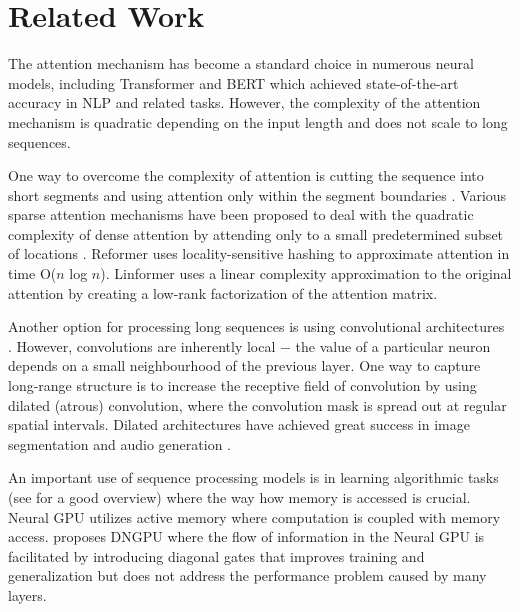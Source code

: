 \documentclass[letterpaper]{article} %
\begin{document}
\section{Related Work}

The attention mechanism \citep{bahdanau2014neural} has become a standard choice in numerous neural models, including Transformer \citep{vaswani2017attention} and BERT \citep{devlin2018bert} which achieved state-of-the-art accuracy in NLP and related tasks. However, the complexity of the attention mechanism is quadratic depending on the input length and does not scale to long sequences.

One way to overcome the complexity of attention is cutting the sequence into short segments and using attention only within the segment boundaries \citep{al2018character}. Various sparse attention mechanisms have been proposed to deal with the quadratic complexity of dense attention by attending only to a small predetermined subset of locations \citep{beltagy2020longformer, zaheer2020big}. Reformer \citep{kitaev2020reformer} uses locality-sensitive hashing to approximate attention in time O($n$ log $n$). Linformer \citep{wang2020linformer} uses a linear complexity approximation to the original attention by creating a low-rank factorization of the attention matrix.

Another option for processing long sequences is using convolutional architectures \citep{gehring2017convolutional}. However, convolutions are inherently local $-$ the value of a particular neuron depends on a small neighbourhood of the previous layer. One way to capture long-range structure is to increase the receptive field of convolution by using dilated (atrous) convolution, where the convolution mask is spread out at regular spatial intervals. Dilated architectures have achieved great success in image segmentation \citep{yu2015multi} and audio generation \citep{oord2016wavenet}.

An important use of sequence processing models is in learning algorithmic tasks (see \citet{kant2018recent} for a good overview) where the way how memory is accessed is crucial. Neural GPU \citep{Kaiser2015NeuralGPU} utilizes active memory \citep{kaiser2016can} where computation is coupled with memory access. \citet{freivalds2017improving} proposes DNGPU where the flow of information in the Neural GPU is facilitated by introducing diagonal gates that improves training and generalization but does not address the performance problem caused by many layers.
\end{document}
